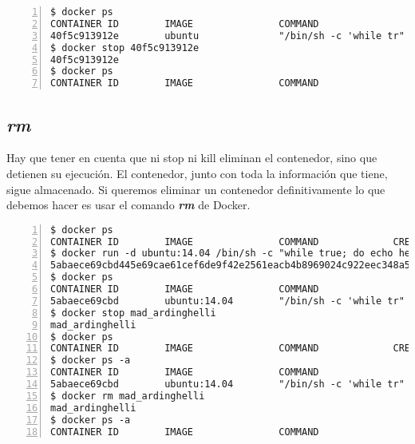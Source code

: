 	\begin{lstlisting}[style=consola,numbers=left]
$ docker ps
CONTAINER ID        IMAGE               COMMAND                  CREATED             STATUS              PORTS               NAMES
40f5c913912e        ubuntu              "/bin/sh -c 'while tr"   2 seconds ago       Up 2 seconds                            adoring_euclid
$ docker stop 40f5c913912e
40f5c913912e
$ docker ps
CONTAINER ID        IMAGE               COMMAND                  CREATED             STATUS              PORTS               NAMES

	\end{lstlisting}
	
	\subsection{\textit{rm}}
	Hay que tener en cuenta que ni stop ni kill eliminan el contenedor, sino que detienen su ejecución. El contenedor, junto con toda la información que tiene, sigue almacenado. Si queremos eliminar un contenedor definitivamente lo que debemos hacer es usar el comando \textbf{\emph{rm}} de Docker.
	
	\begin{lstlisting}[style=consola,numbers=left]
$ docker ps
CONTAINER ID        IMAGE               COMMAND             CREATED             STATUS              PORTS               NAMES
$ docker run -d ubuntu:14.04 /bin/sh -c "while true; do echo hello world; sleep 1; done"
5abaece69cbd445e69cae61cef6de9f42e2561eacb4b8969024c922eec348a5d
$ docker ps
CONTAINER ID        IMAGE               COMMAND                  CREATED             STATUS              PORTS               NAMES
5abaece69cbd        ubuntu:14.04        "/bin/sh -c 'while tr"   3 seconds ago       Up 2 seconds                            mad_ardinghelli
$ docker stop mad_ardinghelli
mad_ardinghelli
$ docker ps
CONTAINER ID        IMAGE               COMMAND             CREATED             STATUS              PORTS               NAMES
$ docker ps -a
CONTAINER ID        IMAGE               COMMAND                  CREATED             STATUS                       PORTS               NAMES
5abaece69cbd        ubuntu:14.04        "/bin/sh -c 'while tr"   5 minutes ago       Exited (137) 4 minutes ago                       mad_ardinghelli
$ docker rm mad_ardinghelli
mad_ardinghelli
$ docker ps -a
CONTAINER ID        IMAGE               COMMAND                  CREATED             STATUS                       PORTS               NAMES
	\end{lstlisting}	
	
